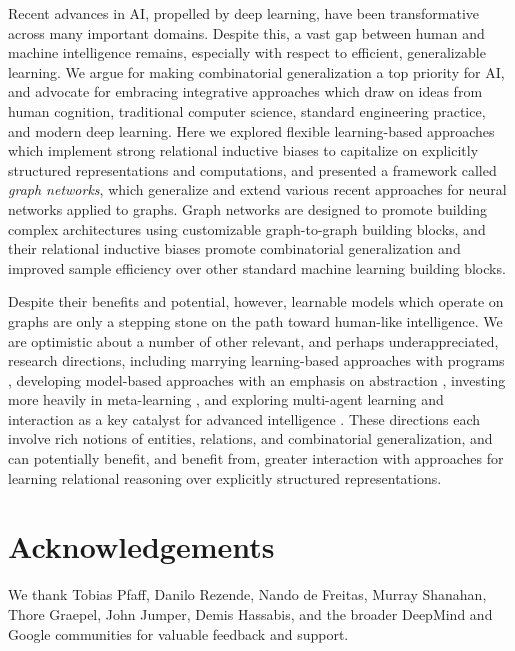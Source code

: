 Recent advances in AI, propelled by deep learning, have been transformative across many important domains. Despite this, a vast gap between human and machine intelligence remains, especially with respect to efficient, generalizable learning. We argue for making combinatorial generalization a top priority for AI, and advocate for embracing integrative approaches which draw on ideas from human cognition, traditional computer science, standard engineering practice, and modern deep learning. Here we explored flexible learning-based approaches which implement strong relational inductive biases to capitalize on explicitly structured representations and computations, and presented a framework called \emph{graph networks}, which generalize and extend various recent approaches for neural networks applied to graphs. Graph networks are designed to promote building complex architectures using customizable graph-to-graph building blocks, and their relational inductive biases promote combinatorial generalization and improved sample efficiency over other standard machine learning building blocks. 

Despite their benefits and potential, however, learnable models which operate on graphs are only a stepping stone on the path toward human-like intelligence.
We are optimistic about a number of other relevant, and perhaps underappreciated, research directions, including marrying learning-based approaches with programs \citep{ritchie2016deep,andreas2016neural,gaunt2016differentiable,evans2018learning,evans2018can}, developing model-based approaches with an emphasis on abstraction \citep{kansky2017schema,konidaris2018skills,zhang2018composable,hay2018behavior}, investing more heavily in meta-learning \citep{wang2016learning,wang2018prefrontal,finn2017model}, and exploring multi-agent learning and interaction as a key catalyst for advanced intelligence \citep{nowak2006five,ohtsuki2006simple}.
These directions each involve rich notions of entities, relations, and combinatorial generalization, and can potentially benefit, and benefit from, greater interaction with approaches for learning relational reasoning over explicitly structured representations.


\section*{Acknowledgements}

We thank Tobias Pfaff, Danilo Rezende, Nando de Freitas, Murray Shanahan, Thore Graepel, John Jumper, Demis Hassabis, and the broader DeepMind and Google communities for valuable feedback and support.

